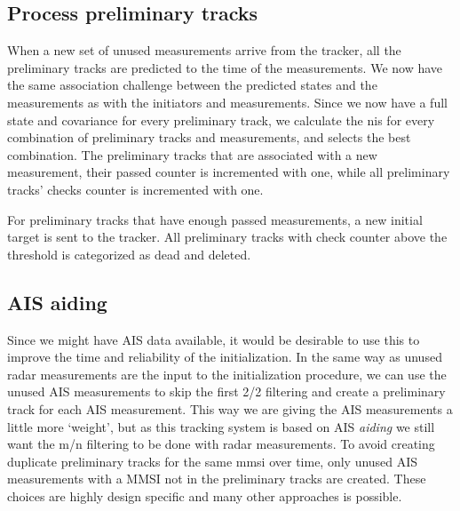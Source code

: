 \subsection{Process preliminary tracks}
When a new set of unused measurements arrive from the tracker, all the preliminary tracks are predicted to the time of the measurements. We now have the same association challenge between the predicted states and the measurements as with the initiators and measurements. Since we now have a full state and covariance for every preliminary track, we calculate the \gls{nis} for every combination of preliminary tracks and measurements, and selects the best combination. The preliminary tracks that are associated with a new measurement, their passed counter is incremented with one, while all preliminary tracks' checks counter is incremented with one. 

For preliminary tracks that have enough passed measurements, a new initial target is sent to the tracker. All preliminary tracks with check counter above the threshold is categorized as dead and deleted. 

\subsection{AIS aiding}
Since we might have AIS data available, it would be desirable to use this to improve the time and reliability of the initialization. In the same way as unused radar measurements are the input to the initialization procedure, we can use the unused AIS measurements to skip the first 2/2 filtering and create a preliminary track for each AIS measurement. This way we are giving the AIS measurements a little more `weight', but as this tracking system is based on AIS \emph{aiding} we still want the m/n filtering to be done with radar measurements. To avoid creating duplicate preliminary tracks for the same \gls{mmsi} over time, only unused AIS measurements with a MMSI not in the preliminary tracks are created. These choices are highly design specific and many other approaches is possible. 



